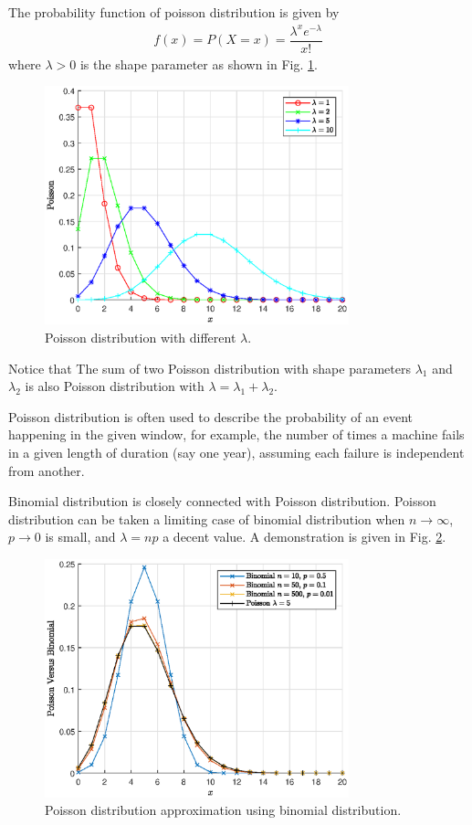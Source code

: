 The probability function of poisson distribution is given by
\begin{eqnarray}
  f(x) = P(X=x) = \dfrac{\lambda^xe^{-\lambda}}{x!} \nonumber
\end{eqnarray}
where $\lambda >0$ is the shape parameter as shown in Fig. \ref{fig:poisson_pmf}.
\begin{figure}
	\centering
	\includegraphics[width=250pt]{chapters/ch-commonly-seen-distributions/figs/poisson_pmf.eps}
	\caption{Poisson distribution with different $\lambda$.} \label{fig:poisson_pmf}
\end{figure}

Notice that The sum of two Poisson distribution with shape parameters $\lambda_1$ and $\lambda_2$ is also Poisson distribution with $\lambda = \lambda_1 + \lambda_2$.

Poisson distribution is often used to describe the probability of an event happening in the given window, for example, the number of times a machine fails in a given length of duration (say one year), assuming each failure is independent from another. 

Binomial distribution is closely connected with Poisson distribution. Poisson distribution can be taken a limiting case of binomial distribution when $n\rightarrow\infty$, $p\rightarrow 0$ is small, and $\lambda = np$ a decent value. A demonstration is given in Fig. \ref{fig:poisson_vs_b}.
\begin{figure}
	\centering
	\includegraphics[width=250pt]{chapters/ch-commonly-seen-distributions/figs/poisson_vs_b.eps}
	\caption{Poisson distribution approximation using binomial distribution.} \label{fig:poisson_vs_b}
\end{figure}

